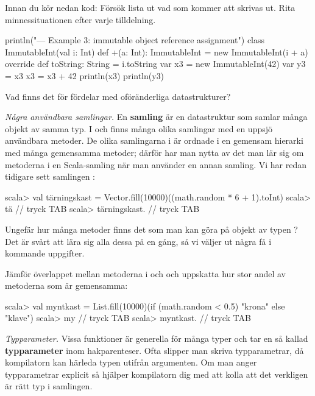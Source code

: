 \Subtask\Pen Innan du kör nedan kod: Försök lista ut vad som kommer att skrivas ut. Rita minnessituationen efter varje tilldelning.

\begin{Code}
println("\n--- Example 3: immutable object reference assignment")
class ImmutableInt(val i: Int) {
  def +(a: Int): ImmutableInt = new ImmutableInt(i + a) 
  override def toString: String = i.toString
}
var x3 = new ImmutableInt(42)
var y3 = x3
x3 = x3 + 42
println(x3)
println(y3)
\end{Code}

\Subtask\Pen Vad finns det för fördelar med oföränderliga datastrukturer?


\Task \emph{Några användbara samlingar.} En \textbf{samling}  är en datastruktur som samlar många objekt av samma typ. I  och  finns många olika samlingar med en uppsjö användbara metoder. De olika samlingarna i  är ordnade i en gemensam hierarki med många gemensamma metoder; därför har man nytta av det man lär sig om metoderna i en Scala-samling när man använder en annan samling. Vi har redan tidigare sett samlingen :

\begin{REPL}
scala> val tärningskast = Vector.fill(10000)((math.random * 6 + 1).toInt)
scala> tä   // tryck TAB
scala> tärningskast.  // tryck TAB
\end{REPL}

\Subtask Ungefär hur många metoder finns det som man kan göra på objekt av typen ? Det är svårt att lära sig alla dessa på en gång, så vi väljer ut några få i kommande uppgifter.

\Subtask Jämför överlappet mellan metoderna i  och  och uppskatta hur stor andel av metoderna som är gemensamma: 
\begin{REPL}
scala> val myntkast = 
         List.fill(10000)(if (math.random < 0.5) "krona" else "klave")
scala> my   // tryck TAB
scala> myntkast.  // tryck TAB
\end{REPL}

\Task \emph{Typparameter.} Vissa funktioner är generella för många typer och tar en så kallad \textbf{typparameter} inom hakparenteser. Ofta slipper man skriva typparametrar, då kompilatorn kan härleda typen utifrån argumenten. Om man anger typparametrar explicit så hjälper kompilatorn dig med att kolla att det verkligen är rätt typ i samlingen. 

